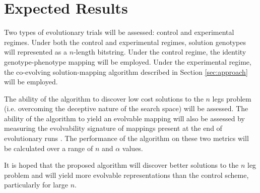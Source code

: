 \section{Expected Results}

Two types of evolutionary trials will be assessed: control and experimental regimes.
Under both the control and experimental regimes, solution genotypes will represented as a $n$-length bitstring.
Under the control regime, the identity genotype-phenotype mapping will be employed.
Under the experimental regime, the co-evolving solution-mapping algorithm described in Section \ref{sec:approach} will be employed.

The ability of the algorithm to discover low cost solutions to the $n$ legs problem (i.e. overcoming the deceptive nature of the search space) will be assessed.
The ability of the algorithm to yield an evolvable mapping will also be assessed by measuring the evolvability signature of mappings present at the end of evolutionary runs \cite{tarapore2015evolvability}.
The performance of the algorithm on these two metrics will be calculated over a range of $n$ and $\alpha$ values.

It is hoped that the proposed algorithm will discover better solutions to the $n$ leg problem and will yield more evolvable representations than the control scheme, particularly for large $n$.
